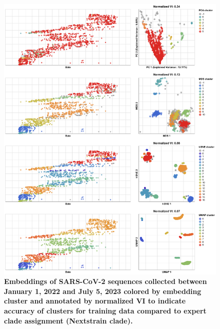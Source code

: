 \documentclass[10pt,letterpaper]{article}
\begin{document}
\begin{figure}[!h]
\includegraphics[width=\columnwidth]{figures/sarscov2-test-embeddings-by-cluster-vs-Nextstrain_clade.png}
\caption{{\bf Embeddings of SARS-CoV-2 sequences collected between January 1, 2022 and July 5, 2023 colored by embedding cluster and annotated by normalized VI to indicate accuracy of clusters for training data compared to expert clade assignment (Nextstrain clade).}
}
\label{fig:sars-cov-2-2022-2023-clusters-vs-Nextstrain-clade}
\end{figure}
\end{document}
